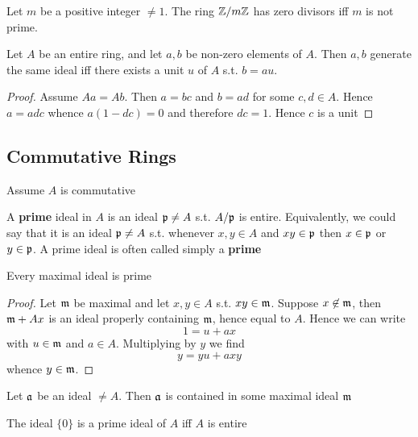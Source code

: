 \documentclass[11pt]{article}
\begin{document}
Let \(m\) be a positive integer \(\neq 1\). The ring \(\mathbb{Z}/m\mathbb{Z}\) has zero divisors iff \(m\) is not
prime.

\begin{proposition}[]
Let \(A\) be an entire ring, and let \(a,b\) be non-zero elements of \(A\). Then \(a,b\) generate
the same ideal iff there exists a unit \(u\) of \(A\) s.t. \(b=au\).
\end{proposition}

\begin{proof}
Assume \(Aa=Ab\). Then \(a=bc\) and \(b=ad\) for some \(c,d\in A\). Hence \(a=adc\)
whence \(a(1-dc)=0\) and therefore \(dc=1\). Hence \(c\) is a unit
\end{proof}

\subsection{Commutative Rings}
\label{sec:org41c3a4e}
Assume \(A\) is commutative

A \textbf{prime} ideal in \(A\) is an ideal \(\mathfrak{p}\neq A\) s.t. \(A/\mathfrak{p}\) is entire. Equivalently, we could say
that it is an ideal \(\mathfrak{p}\neq A\) s.t. whenever \(x,y\in A\) and \(xy\in\mathfrak{p}\) then \(x\in\mathfrak{p}\) or \(y\in\mathfrak{p}\). A
prime ideal is often called simply a \textbf{prime}

\begin{proposition}[]
Every maximal ideal is prime
\end{proposition}

\begin{proof}
Let \(\mathfrak{m}\) be maximal and let \(x,y\in A\) s.t. \(xy\in\mathfrak{m}\). Suppose \(x\not\in\mathfrak{m}\), then \(\mathfrak{m}+Ax\) is an
ideal properly containing \(\mathfrak{m}\), hence equal to \(A\). Hence we can write
\begin{equation*}
1=u+ax
\end{equation*}
with \(u\in\mathfrak{m}\) and \(a\in A\). Multiplying by \(y\) we find
\begin{equation*}
y=yu+axy
\end{equation*}
whence \(y\in\mathfrak{m}\).
\end{proof}

\begin{proposition}[]
Let \(\mathfrak{a}\) be an ideal \(\neq A\). Then \(\mathfrak{a}\) is contained in some maximal ideal \(\mathfrak{m}\)
\end{proposition}

\begin{proposition}[]
The ideal \(\{0\}\) is a prime ideal of \(A\) iff \(A\) is entire
\end{proposition}
\end{document}
